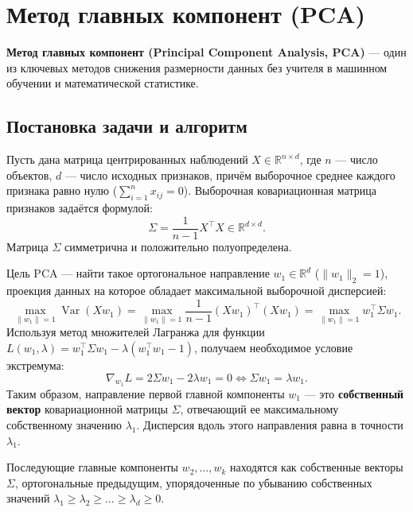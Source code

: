 \section{Метод главных компонент (PCA)}

\textbf{Метод главных компонент (Principal Component Analysis, PCA)} — один из ключевых методов снижения размерности
данных без учителя в машинном обучении и математической статистике.

\subsection{Постановка задачи и алгоритм}
Пусть дана матрица центрированных наблюдений $X \in \mathbb{R}^{n \times d}$, где $n$ — число объектов, $d$ — число
исходных признаков, причём выборочное среднее каждого признака равно нулю ($\sum_{i=1}^n x_{ij} = 0$).
Выборочная ковариационная матрица признаков задаётся формулой:
\[ \Sigma = \frac{1}{n - 1} X^\top X \in \mathbb{R}^{d \times d}. \]
Матрица $\Sigma$ симметрична и положительно полуопределена.

Цель PCA — найти такое ортогональное направление $w_1 \in \mathbb{R}^d$ ($\|w_1\|_2 =1$), проекция данных на которое
обладает максимальной выборочной дисперсией:
\[ \max_{\|w_1\| = 1} \operatorname{Var}(X w_1) = \max_{\|w_1\| = 1} \frac{1}{n-1} (X w_1)^\top (X w_1) =
\max_{\|w_1\| = 1} w_1^\top \Sigma w_1. \]
Используя метод множителей Лагранжа для функции $L(w_1, \lambda) =w_1^\top \Sigma w_1 - \lambda (w_1^\top w_1 - 1)$,
получаем необходимое условие экстремума:
\[ \nabla_{w_1} L = 2 \Sigma w_1 - 2 \lambda w_1 = 0 \iff \Sigma w_1 = \lambda w_1. \]
Таким образом, направление первой главной компоненты $w_1$ — это \textbf{собственный вектор} ковариационной матрицы
$\Sigma$, отвечающий ее максимальному собственному значению $\lambda_1$.
Дисперсия вдоль этого направления равна в точности $\lambda_1$.

Последующие главные компоненты $w_2,\dots,w_k$ находятся как собственные векторы $\Sigma$, ортогональные предыдущим,
упорядоченные по убыванию собственных значений $\lambda_1 \ge \lambda_2 \ge \dots \ge \lambda_d \ge 0$.

